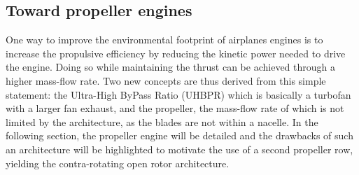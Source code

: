 \subsection{Toward propeller engines}
\label{sub:cror_toward_propeller}

One way to improve the environmental footprint of
airplanes engines is to increase the propulsive efficiency
by reducing the kinetic power needed to drive the engine.
Doing so while maintaining the thrust can be achieved through
a higher mass-flow rate. Two new concepts are thus derived from
this simple statement: the
Ultra-High ByPass Ratio (UHBPR) which
is basically a turbofan with a larger fan exhaust, and the
propeller, the mass-flow rate of which is not limited
by the architecture, as the blades are not within a nacelle.
In the following section, the propeller engine will be detailed
and the drawbacks of such an architecture will be highlighted to
motivate the use
of a second propeller row, yielding the contra-rotating open rotor
architecture.


